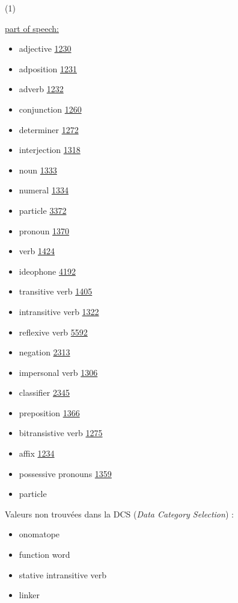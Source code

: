 \documentclass[a4paper,12pt]{article}
\begin{document}
\hypertarget{1}{(1)}
\hyperlink{pos}{part of speech:}
\begin{itemize}
\item adjective \href{http://www.isocat.org/datcat/DC-1230}{1230}
\item adposition \href{http://www.isocat.org/datcat/DC-1231}{1231}
\item adverb \href{http://www.isocat.org/datcat/DC-1232}{1232}
\item conjunction \href{http://www.isocat.org/datcat/DC-1260}{1260}
\item determiner \href{http://www.isocat.org/datcat/DC-1272}{1272}
\item interjection \href{http://www.isocat.org/datcat/DC-1318}{1318}
\item noun \href{http://www.isocat.org/datcat/DC-1333}{1333}
\item numeral \href{http://www.isocat.org/datcat/DC-1334}{1334}
\item particle \href{http://www.isocat.org/datcat/DC-3372}{3372}
\item pronoun \href{http://www.isocat.org/datcat/DC-1370}{1370}
\item verb \href{http://www.isocat.org/datcat/DC-1424}{1424}
\item ideophone \href{http://www.isocat.org/datcat/DC-4192}{4192}
\item transitive verb \href{http://www.isocat.org/datcat/DC-1405}{1405}
\item intransitive verb \href{http://www.isocat.org/datcat/DC-1322}{1322}
\item reflexive verb \href{http://www.isocat.org/datcat/DC-5592}{5592}
\item negation \href{http://www.isocat.org/datcat/DC-2313}{2313}
\item impersonal verb \href{http://www.isocat.org/datcat/DC-1306}{1306}
\item classifier \href{http://www.isocat.org/datcat/DC-2345}{2345}
\item preposition \href{http://www.isocat.org/datcat/DC-1366}{1366}
\item  bitransistive verb \href{http://www.isocat.org/datcat/DC-1275}{1275}
\item affix \href{http://www.isocat.org/datcat/DC-1234}{1234}
\item possessive pronouns \href{http://www.isocat.org/datcat/DC-1359}{1359}
\item particle
\end{itemize}
Valeurs non trouv\'ees dans la DCS (\textit{Data Category Selection}) :
\begin{itemize}
\item onomatope
\item function word
\item stative intransitive verb
\item linker
\end{itemize}
\end{document}
